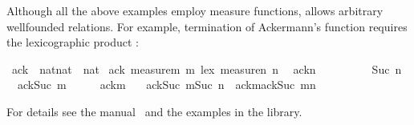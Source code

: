 \begin{isabelle}
\begin{isamarkuptext}
Although all the above examples employ measure functions, 
allows arbitrary wellfounded relations. For example, termination of
Ackermann's function requires the lexicographic product :%
\end{isamarkuptext}%
\ ack\ {\isacharcolon}{\isacharcolon}\ {\isachardoublequote}nat{\isacharasterisk}nat\ {\isasymRightarrow}\ nat{\isachardoublequote}\isanewline
{}\ ack\ {\isachardoublequote}measure{\isacharparenleft}{\isacharpercent}m{\isachardot}\ m{\isacharparenright}\ {\isacharless}{\isacharasterisk}lex{\isacharasterisk}{\isachargreater}\ measure{\isacharparenleft}{\isacharpercent}n{\isachardot}\ n{\isacharparenright}{\isachardoublequote}\isanewline
\ \ {\isachardoublequote}ack{\isacharparenleft}n{\isacharparenright}\ \ \ \ \ \ \ \ \ {\isacharequal}\ Suc\ n{\isachardoublequote}\isanewline
\ \ {\isachardoublequote}ack{\isacharparenleft}Suc\ m{\isacharcomma}\ \ \ \ \ {\isacharequal}\ ack{\isacharparenleft}m{\isacharcomma}\ \isanewline
\ \ {\isachardoublequote}ack{\isacharparenleft}Suc\ m{\isacharcomma}Suc\ n{\isacharparenright}\ {\isacharequal}\ ack{\isacharparenleft}m{\isacharcomma}ack{\isacharparenleft}Suc\ m{\isacharcomma}n{\isacharparenright}{\isacharparenright}{\isachardoublequote}%
\begin{isamarkuptext}%
\noindent
For details see the manual~\cite{isabelle-HOL} and the examples in the
library.%
\end{isamarkuptext}%
\end{isabelle}%

